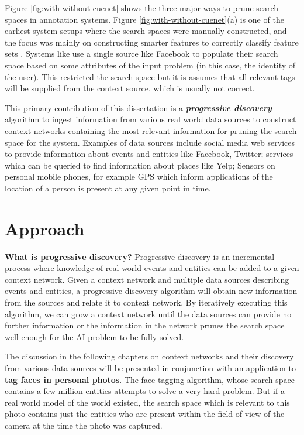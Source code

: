 Figure \ref{fig:with-without-cuenet} shows the three major ways to prune search spaces in annotation systems. Figure \ref{fig:with-without-cuenet}(a) is one of the earliest system setups where the search spaces were manually constructed, and the focus was mainly on constructing smarter features to correctly classify feature sets \cite{turk1991eigenfaces, belhumeur1997eigenfaces}. Systems like \cite{stone2008autotagging} use a single source like Facebook to populate their search space based on some attributes of the input problem (in this case, the identity of the user). This restricted the search space but it is assumes that all relevant tags will be supplied from the context source, which is usually not correct.

This primary \uline{contribution} of this dissertation is a \textbf{\textit{progressive discovery}} algorithm to ingest information from various real world data sources to construct context networks containing the most relevant information for pruning the search space for the system. Examples of data sources include social media web services to provide information about events and entities like Facebook, Twitter; services which can be queried to find information about places like Yelp; Sensors on personal mobile phones, for example GPS which inform applications of the location of a person is present at any given point in time.

\section{Approach}

\textbf{What is progressive discovery?} Progressive discovery is an incremental process where knowledge of real world events and entities can be added to a given context network. Given a context network and multiple data sources describing events and entities, a progressive discovery algorithm will obtain new information from the sources and relate it to context network. By iteratively executing this algorithm, we can grow a context network until the data sources can provide no further information or the information in the network prunes the search space well enough for the AI problem to be fully solved.

The discussion in the following chapters on context networks and their discovery from various data sources will be presented in conjunction with an application to \textbf{tag faces in personal photos}. The face tagging algorithm, whose search space contains a few million entities attempts to solve a very hard problem. But if a real world model of the world existed, the search space which is relevant to this photo contains just the entities who are present within the field of view of the camera at the time the photo was captured. 

